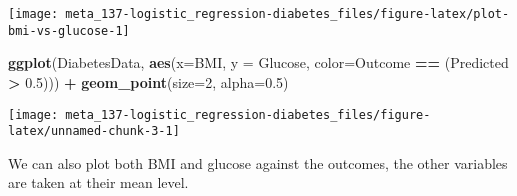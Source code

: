\documentclass[]{book}
\newenvironment{Shaded}{\begin{snugshade}}{\end{snugshade}}
\newcommand{\CommentTok}[1]{\textcolor[rgb]{0.56,0.35,0.01}{\textit{#1}}}
\newcommand{\DataTypeTok}[1]{\textcolor[rgb]{0.13,0.29,0.53}{#1}}
\newcommand{\DecValTok}[1]{\textcolor[rgb]{0.00,0.00,0.81}{#1}}
\newcommand{\FloatTok}[1]{\textcolor[rgb]{0.00,0.00,0.81}{#1}}
\newcommand{\KeywordTok}[1]{\textcolor[rgb]{0.13,0.29,0.53}{\textbf{#1}}}
\newcommand{\NormalTok}[1]{#1}
\newcommand{\OperatorTok}[1]{\textcolor[rgb]{0.81,0.36,0.00}{\textbf{#1}}}
\newcommand{\StringTok}[1]{\textcolor[rgb]{0.31,0.60,0.02}{#1}}
\begin{document}
\begin{center}\texttt{[image: meta\_137-logistic\_regression-diabetes\_files/figure-latex/plot-bmi-vs-glucose-1]} \end{center}

\begin{Shaded}
\begin{Highlighting}[]
\KeywordTok{ggplot}\NormalTok{(DiabetesData, }\KeywordTok{aes}\NormalTok{(}\DataTypeTok{x=}\NormalTok{BMI, }\DataTypeTok{y =}\NormalTok{ Glucose, }\DataTypeTok{color=}\NormalTok{Outcome }\OperatorTok{==}\StringTok{ }\NormalTok{(Predicted }\OperatorTok{>}\StringTok{ }\FloatTok{0.5}\NormalTok{))) }\OperatorTok{+}\StringTok{ }
\StringTok{    }\KeywordTok{geom_point}\NormalTok{(}\DataTypeTok{size=}\DecValTok{2}\NormalTok{, }\DataTypeTok{alpha=}\FloatTok{0.5}\NormalTok{)}
\end{Highlighting}
\end{Shaded}

\begin{center}\texttt{[image: meta\_137-logistic\_regression-diabetes\_files/figure-latex/unnamed-chunk-3-1]} \end{center}

We can also plot both BMI and glucose against the outcomes, the other variables are taken at their mean level.

\begin{Shaded}
\end{Shaded}
\end{document}
